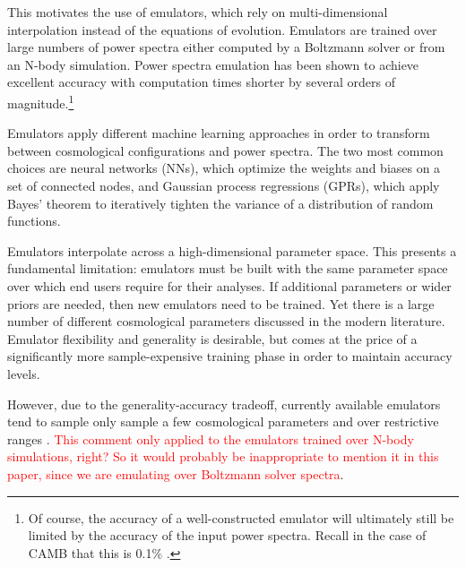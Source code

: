 This motivates the use of emulators, which rely on multi-dimensional 
interpolation instead of the equations of evolution. Emulators are trained 
over large numbers of power spectra either computed
by a Boltzmann solver or from an N-body simulation. Power spectra emulation 
has been shown to achieve excellent accuracy with computation times shorter
by several orders of magnitude.\footnote{Of course, the accuracy of a
well-constructed emulator will ultimately still be limited by the accuracy of 
the input power spectra. Recall in the case of CAMB that this is 0.1\%
.}

Emulators apply different machine
learning approaches in order to transform between cosmological
configurations and power spectra. The two most common choices are neural 
networks (NNs), which optimize the weights and biases on a set of connected 
nodes, and Gaussian process regressions (GPRs), which apply Bayes' theorem to  
iteratively tighten the variance of a distribution of random functions.

Emulators interpolate across a high-dimensional parameter space. This presents
a fundamental limitation: emulators must be built with the same parameter
space over which end users require for their analyses. If additional
parameters or wider priors are needed, then new emulators need to be trained.
Yet there is a large number of different cosmological parameters discussed in 
the modern literature. Emulator flexibility and generality is desirable, but 
comes at the price of a significantly more sample-expensive training phase in
order to maintain accuracy levels.

However, due to the
generality-accuracy tradeoff, currently available emulators tend to sample
only sample a few cosmological parameters and over restrictive ranges
. \textcolor{red}{This comment only applied to the emulators
trained over N-body simulations, right? So it would probably be inappropriate
to mention it in this paper, since we are emulating over Boltzmann solver
spectra}.
\begin{comment}
	``Due to the high computational cost of the required
	simulations, [...] current emulators leave out parameters such as the
	curvature of the Universe or dynamic energy models beyond the standard CPL
	parametrization'' (\cbib{San21}).
\end{comment}

